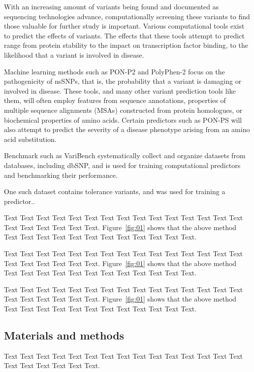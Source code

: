 \documentclass{bioinfo}
\begin{document}
With an increasing amount of variants being found and documented as sequencing technologies advance, computationally screening these variants to find those valuable for further study is important. Various computational tools exist to predict the effects of variants. The effects that these tools attempt to predict range from protein stability to the impact on transcription factor binding, to the likelihood that a variant is involved in disease. 

Machine learning methods such as PON-P2 and PolyPhen-2 focus on the pathogenicity of nsSNPs, that is, the probability that a variant is damaging or involved in disease. These tools, and many other variant prediction tools like them, will often employ features from sequence annotations, properties of multiple sequence alignments (MSAs) constructed from protein homologues, or biochemical properties of amino acids. Certain predictors such as PON-PS will also attempt to predict the severity of a disease phenotype arising from an amino acid substitution. 

Benchmark such as VariBench systematically collect and organize datasets from databases, including dbSNP, and is used for training computational predictors and benchmarking their performance.

One such dataset contains tolerance variants, and was used for training a predictor.. 

Text Text Text Text Text Text  Text Text Text Text Text Text Text
Text Text  Text Text Text Text Text Text. Figure~\ref{fig:01}
shows that the above method  Text Text Text Text  Text Text Text
Text Text Text  Text Text.

Text Text Text Text Text Text  Text Text Text Text Text Text Text
Text Text  Text Text Text Text Text Text. Figure~\ref{fig:01}
shows that the above method  Text Text Text Text  Text Text Text
Text Text Text  Text Text.

Text Text Text Text Text Text  Text Text Text Text Text Text Text
Text Text  Text Text Text Text Text Text. Figure~\ref{fig:01}
shows that the above method  Text Text Text Text  Text Text Text
Text Text Text  Text Text.



\begin{methods}

\section{Materials and methods}

Text Text Text Text Text Text  Text Text Text Text Text Text Text
Text Text  Text Text Text Text Text Text.

\end{methods}
\end{document}
